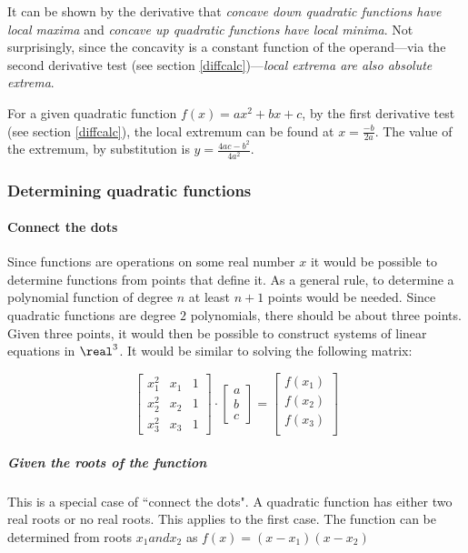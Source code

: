 It can be shown by the derivative that \emph{concave down quadratic functions have local maxima} and \emph{concave up quadratic functions have local minima}.
Not surprisingly, since the concavity is a constant function of the operand---via the second derivative test (see section \ref{diffcalc})---\emph{local extrema are also absolute extrema}.

For a given quadratic function $f(x) = ax^2+bx+c$, by the first derivative test (see section \ref{diffcalc}), the local extremum can be found at $x = \frac{-b}{2a}$.
The value of the extremum, by substitution is $y = \frac{4ac-b^2}{4a^2}$.

\subsubsection{Determining quadratic functions}
\paragraph{Connect the dots}
Since functions are operations on some real number $x$ it would be possible to determine functions from points that define it.
As a general rule, to determine a polynomial function of degree $n$ at least $n+1$ points would be needed.
Since quadratic functions are degree $2$ polynomials, there should be about three points.
Given three points, it would then be possible to construct systems of linear equations in $\real ^3$.
It would be similar to solving the following matrix:

\[
\begin{bmatrix}
x_1^2 & x_1 & 1 \\
x_2^2 & x_2 & 1 \\
x_3^2 & x_3 & 1
\end{bmatrix}
\cdot
\begin{bmatrix}
a \\
b \\
c
\end{bmatrix}
=
\begin{bmatrix}
f(x_1) \\
f(x_2) \\
f(x_3) \\
\end{bmatrix}
\]

\subparagraph{Given the roots of the function}
This is a special case of ``connect the dots".
A quadratic function has either two real roots or no real roots.
This applies to the first case.
The function can be determined from roots $x_1 and x_2$ as $f(x) = (x-x_1)(x-x_2)$

